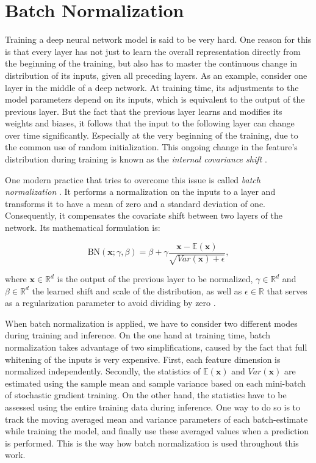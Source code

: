 \section{Batch Normalization}

Training a deep neural network model is said to be very hard. One reason for this is that every layer has not just to learn the overall representation directly from the beginning of the training, but also has to master the continuous change in distribution of its inputs, given all preceding layers. As an example, consider one layer in the middle of a deep network. At training time, its adjustments to the model parameters depend on its inputs, which is equivalent to the output of the previous layer. But the fact that the previous layer learns and modifies its weights and biases, it follows that the input to the following layer can change over time significantly. Especially at the very beginning of the training, due to the common use of random initialization. This ongoing change in the feature's distribution during training is known as the \textit{internal covariance shift} \parencite{rnn-batchnorm}.

One modern practice that tries to overcome this issue is called \textit{batch normalization} \parencite{batchnorm}. It performs a normalization on the inputs to a layer and transforms it to have a mean of zero and a standard deviation of one. Consequently, it compensates the covariate shift between two layers of the network. Its mathematical formulation is:

\begin{equation} \label{eq:bn}
\textrm{BN}(\textbf{x}; \gamma, \beta) = \beta + \gamma \frac{\textbf{x} - \mathbb{E}(\textbf{x})}{\sqrt{Var(\textbf{x}) + \epsilon}} ,
\end{equation}

where $ \textbf{x} \in \mathbb{R}^d $ is the output of the previous layer to be normalized, $\gamma \in \mathbb{R}^d $ and $\beta \in \mathbb{R}^d $ the learned shift and scale of the distribution, as well as $\epsilon \in \mathbb{R} $ that serves as a regularization parameter to avoid dividing by zero \parencite{rnn-batchnorm}.

When batch normalization is applied, we have to consider two different modes during training and inference. On the one hand at training time, batch normalization takes advantage of two simplifications, caused by the fact that full whitening of the inputs is very expensive. First, each feature dimension is normalized independently. Secondly, the statistics of $ \mathbb{E}(\textbf{x}) $ and $ Var(\textbf{x}) $ are estimated using the sample mean and sample variance based on each mini-batch of stochastic gradient training. On the other hand, the statistics have to be assessed using the entire training data during inference. One way to do so is to track the moving averaged mean and variance parameters of each batch-estimate while training the model, and finally use these averaged values when a prediction is performed. This is the way how batch normalization is used throughout this work.

